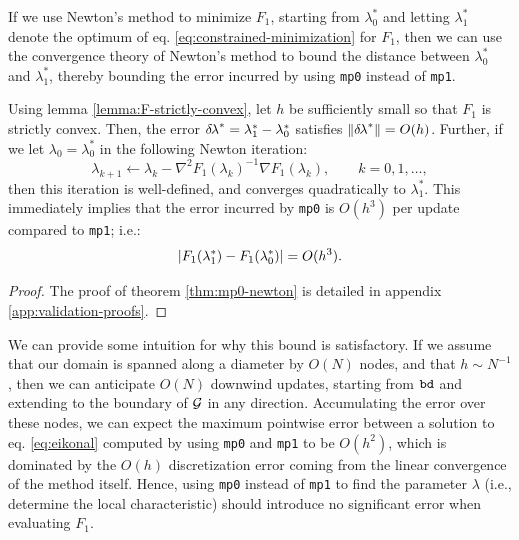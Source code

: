 \documentclass[smallcondensed]{svjour3}
\begin{document}
If we use Newton's method to minimize $F_1$, starting from
$\lambda_0^*$ and letting $\lambda_1^*$ denote the optimum of eq.\@
\ref{eq:constrained-minimization} for $F_1$, then we can use the
convergence theory of Newton's method to bound the distance between
$\lambda_0^*$ and $\lambda_1^*$, thereby bounding the error incurred
by using \texttt{mp0} instead of \texttt{mp1}.

\begin{theorem}\label{thm:mp0-newton}
  Using lemma \ref{lemma:F-strictly-convex}, let $h$ be sufficiently
  small so that $F_1$ is strictly convex. Then, the error
  ${\delta \hspace{-0.1em} \lambda}^* = \lambda_1^* - \lambda_0^*$ satisfies
  $\left\|{\delta \hspace{-0.1em} \lambda}^*\right\| = O(h)$. Further, if we let
  $\lambda_0 = \lambda_0^*$ in the following Newton iteration:
  \begin{equation}
    \label{eq:lam0-iter-to-lam1}
    \lambda_{k+1} \gets \lambda_k - \nabla^2 F_1(\lambda_k)^{-1} \nabla F_1(\lambda_k), \qquad k = 0, 1, \hdots,
  \end{equation}
  then this iteration is well-defined, and converges quadratically to
  $\lambda_1^*$. This immediately implies that the error incurred by
  \texttt{mp0} is $O(h^3)$ per update compared to \texttt{mp1}; i.e.:
  \begin{equation}
    \label{eq:mp0-error}
    \left|F_1(\lambda_1^*) - F_1(\lambda_0^*)\right| = O(h^3).
  \end{equation}
\end{theorem}

\begin{proof}
  The proof of theorem \ref{thm:mp0-newton} is detailed in appendix
  \ref{app:validation-proofs}.
\end{proof}

We can provide some intuition for why this bound is satisfactory. If
we assume that our domain is spanned along a diameter by $O(N)$ nodes,
and that $h \sim N^{-1}$, then we can anticipate $O(N)$ downwind
updates, starting from $\texttt{bd}$ and extending to the boundary of
$\mathcal{G}$ in any direction. Accumulating the error over these nodes, we
can expect the maximum pointwise error between a solution to eq.\@
\ref{eq:eikonal} computed by using \texttt{mp0} and \texttt{mp1} to be
$O(h^2)$, which is dominated by the $O(h)$ discretization error coming
from the linear convergence of the method itself. Hence, using
\texttt{mp0} instead of \texttt{mp1} to find the parameter $\lambda$
(i.e., determine the local characteristic) should introduce no
significant error when evaluating $F_1$.
\end{document}
